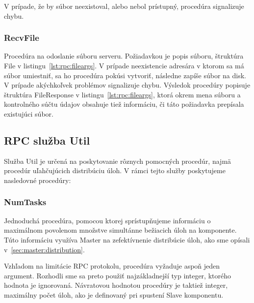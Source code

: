 V prípade, že by súbor neexistoval, alebo nebol prístupný, procedúra signalizuje chybu.

\subsubsection{RecvFile}

Procedúra na odoslanie súboru serveru. Požiadavkou je popis súboru, štruktúra
File v listingu~\ref{lst:rpc:fileargs}. V prípade neexistencie adresára v ktorom
sa má súbor umiestniť, sa ho procedúra pokúsi vytvoriť, následne zapíše súbor
na disk. V prípade akýchkoľvek problémov signalizuje chybu. Výsledok procedúry
popisuje štruktúra FileResponse v listingu~\ref{lst:rpc:fileargs}, ktorá okrem mena
súboru a kontrolného súčtu údajov obsahuje tiež informáciu, či táto požiadavka
prepísala existujúci súbor.

\subsection{RPC služba Util}
\label{sec:slave:rpc:util}

Služba Util je určená na poskytovanie rôznych pomocných procedúr, najmä procedúr
uľahčujúcich distribúciu úloh. V rámci tejto služby poskytujeme nasledovné
procedúry:

\subsubsection{NumTasks}

Jednoduchá procedúra, pomocou ktorej sprístupňujeme informáciu o maximálnom
povolenom množstve simultánne bežiacich úloh na komponente. Túto informáciu
využíva Master na zefektívnenie distribúcie úloh, ako sme opísali v~\ref{sec:master:distribution}.

Vzhľadom na limitácie RPC protokolu, procedúra vyžaduje aspoň jeden argument. Rozhodli
sme sa preto použiť najzákladnejší typ integer, ktorého hodnota je ignorovaná. Návratovou
hodnotou procedúry je taktiež integer, maximálny počet úloh, ako je definovaný pri
spustení Slave komponentu.
